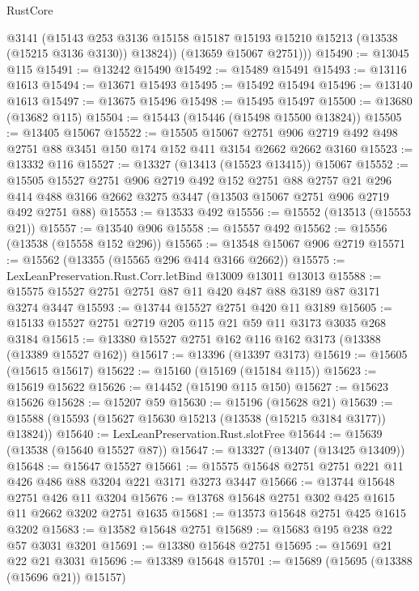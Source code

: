 \begin{lexlean}{RustCore}
\begin{coremodule}
          @3141
          (@15143
            @253
            @3136
            @15158
            @15187
            @15193
            @15210
            @15213
            (@13538 (@15215 @3136 @3130))
            @13824))
        (@13659 @15067 @2751)))
@15490 := @13045 @115
@15491 := @13242 @15490
@15492 := @15489 @15491
@15493 := @13116 @1613
@15494 := @13671 @15493
@15495 := @15492 @15494
@15496 := @13140 @1613
@15497 := @13675 @15496
@15498 := @15495 @15497
@15500 := @13680 (@13682 @115)
@15504 := @15443 (@15446 (@15498 @15500 @13824))
@15505 := @13405 @15067
@15522 := @15505
    @15067
    @2751
    @906
    @2719
    @492
    @498
    @2751
    @88
    @3451
    @150
    @174
    @152
    @411
    @3154
    @2662
    @2662
    @3160
@15523 := @13332 @116
@15527 := @13327 (@13413 (@15523 @13415)) @15067
@15552 := @15505
    @15527
    @2751
    @906
    @2719
    @492
    @152
    @2751
    @88
    @2757
    @21
    @296
    @414
    @488
    @3166
    @2662
    @3275
    @3447
    (@13503 @15067 @2751 @906 @2719 @492 @2751 @88)
@15553 := @13533 @492
@15556 := @15552 (@13513 (@15553 @21))
@15557 := @13540 @906
@15558 := @15557 @492
@15562 := @15556 (@13538 (@15558 @152 @296))
@15565 := @13548 @15067 @906 @2719
@15571 := @15562 (@13355 (@15565 @296 @414 @3166 @2662))
@15575 := LexLeanPreservation.Rust.Corr.letBind @13009 @13011 @13013
@15588 := @15575 @15527 @2751 @2751 @87 @11 @420 @487 @88 @3189 @87 @3171 @3274 @3447
@15593 := @13744 @15527 @2751 @420 @11 @3189
@15605 := @15133 @15527 @2751 @2719 @205 @115 @21 @59 @11 @3173 @3035 @268 @3184
@15615 := @13380 @15527 @2751 @162 @116 @162 @3173 (@13388 (@13389 @15527 @162))
@15617 := @13396 (@13397 @3173)
@15619 := @15605 (@15615 @15617)
@15622 := @15160 (@15169 (@15184 @115))
@15623 := @15619 @15622
@15626 := @14452 (@15190 @115 @150)
@15627 := @15623 @15626
@15628 := @15207 @59
@15630 := @15196 (@15628 @21)
@15639 := @15588 (@15593 (@15627 @15630 @15213 (@13538 (@15215 @3184 @3177)) @13824))
@15640 := LexLeanPreservation.Rust.slotFree
@15644 := @15639 (@13538 (@15640 @15527 @87))
@15647 := @13327 (@13407 (@13425 @13409))
@15648 := @15647 @15527
@15661 := @15575 @15648 @2751 @2751 @221 @11 @426 @486 @88 @3204 @221 @3171 @3273 @3447
@15666 := @13744 @15648 @2751 @426 @11 @3204
@15676 := @13768 @15648 @2751 @302 @425 @1615 @11 @2662 @3202 @2751 @1635
@15681 := @13573 @15648 @2751 @425 @1615 @3202
@15683 := @13582 @15648 @2751
@15689 := @15683 @195 @238 @22 @57 @3031 @3201
@15691 := @13380 @15648 @2751
@15695 := @15691 @21 @22 @21 @3031
@15696 := @13389 @15648
@15701 := @15689 (@15695 (@13388 (@15696 @21)) @15157)

\end{coremodule}
\end{lexlean}
